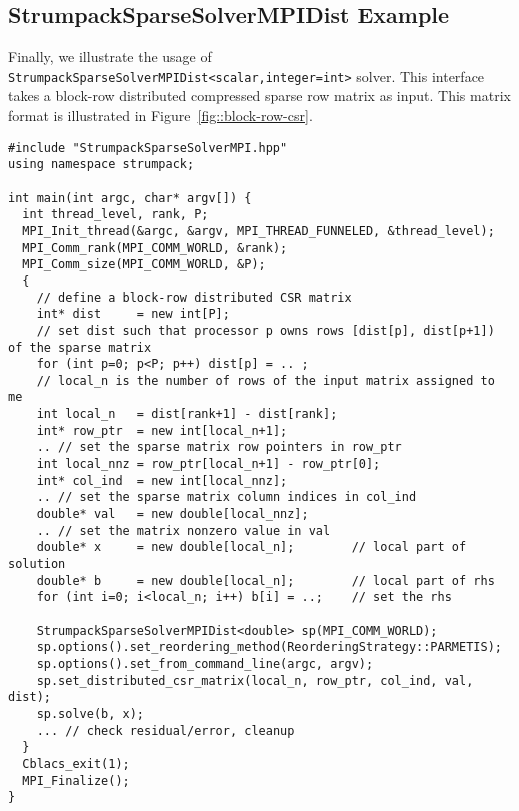 \documentclass{article}
\begin{document}
\subsection{StrumpackSparseSolverMPIDist Example}
Finally, we illustrate the usage of
\lstinline[style=C]!StrumpackSparseSolverMPIDist<scalar,integer=int>!
solver. This interface takes a block-row distributed compressed sparse
row matrix as input. This matrix format is illustrated in
Figure~\ref{fig::block-row-csr}.
\begin{lstlisting}[style=C]
#include "StrumpackSparseSolverMPI.hpp"
using namespace strumpack;

int main(int argc, char* argv[]) {
  int thread_level, rank, P;
  MPI_Init_thread(&argc, &argv, MPI_THREAD_FUNNELED, &thread_level);
  MPI_Comm_rank(MPI_COMM_WORLD, &rank);
  MPI_Comm_size(MPI_COMM_WORLD, &P);
  {
    // define a block-row distributed CSR matrix
    int* dist     = new int[P];
    // set dist such that processor p owns rows [dist[p], dist[p+1]) of the sparse matrix
    for (int p=0; p<P; p++) dist[p] = .. ;
    // local_n is the number of rows of the input matrix assigned to me
    int local_n   = dist[rank+1] - dist[rank];
    int* row_ptr  = new int[local_n+1];
    .. // set the sparse matrix row pointers in row_ptr
    int local_nnz = row_ptr[local_n+1] - row_ptr[0];
    int* col_ind  = new int[local_nnz];
    .. // set the sparse matrix column indices in col_ind
    double* val   = new double[local_nnz];
    .. // set the matrix nonzero value in val
    double* x     = new double[local_n];        // local part of solution
    double* b     = new double[local_n];        // local part of rhs
    for (int i=0; i<local_n; i++) b[i] = ..;    // set the rhs

    StrumpackSparseSolverMPIDist<double> sp(MPI_COMM_WORLD);
    sp.options().set_reordering_method(ReorderingStrategy::PARMETIS);
    sp.options().set_from_command_line(argc, argv);
    sp.set_distributed_csr_matrix(local_n, row_ptr, col_ind, val, dist);
    sp.solve(b, x);
    ... // check residual/error, cleanup
  }
  Cblacs_exit(1);
  MPI_Finalize();
}
\end{lstlisting}
\end{document}
